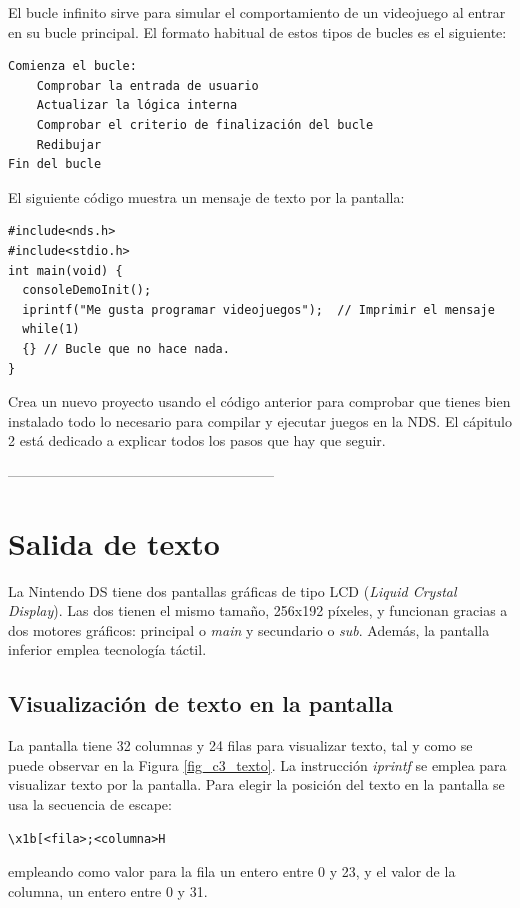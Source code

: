El bucle infinito sirve para simular el comportamiento de un videojuego al entrar en su bucle principal. El formato habitual de estos tipos de bucles es el siguiente:

\begin{verbatim}
Comienza el bucle:
    Comprobar la entrada de usuario
    Actualizar la lógica interna
    Comprobar el criterio de finalización del bucle
    Redibujar
Fin del bucle
\end{verbatim}



\begin{example}
	El siguiente código muestra un mensaje de texto por la pantalla:
\begin{lstlisting}
#include<nds.h>
#include<stdio.h>
int main(void) {
  consoleDemoInit();
  iprintf("Me gusta programar videojuegos");  // Imprimir el mensaje 
  while(1) 
  {} // Bucle que no hace nada.     
}
\end{lstlisting}
\end{example}


\begin{exercise}
	Crea un nuevo proyecto usando el código anterior para comprobar que tienes bien instalado todo lo necesario para compilar y ejecutar juegos en la NDS. El cápitulo 2 está dedicado a explicar todos los pasos que hay que seguir. 
\end{exercise}

 ---------------------------------------------------------
\section{Salida de texto}
La Nintendo DS tiene dos pantallas gráficas de tipo LCD (\textit{Liquid Crystal Display}). Las dos tienen el mismo tamaño, 256x192 píxeles, y funcionan gracias a dos motores gráficos: principal o \textit{main} y secundario o \textit{sub}. Además, la pantalla inferior emplea tecnología táctil.

\subsection{Visualización de texto en la pantalla}
La pantalla tiene 32 columnas y 24 filas para visualizar texto, tal y como se puede observar en la Figura \ref{fig_c3_texto}. La instrucción \textit{iprintf} se emplea para visualizar texto por la pantalla. Para elegir la posición del texto en la pantalla se usa la secuencia de escape:
\begin{verbatim}
\x1b[<fila>;<columna>H
\end{verbatim}
empleando como valor para la fila un entero entre 0 y 23, y el valor de la columna, un entero entre 0 y 31.

